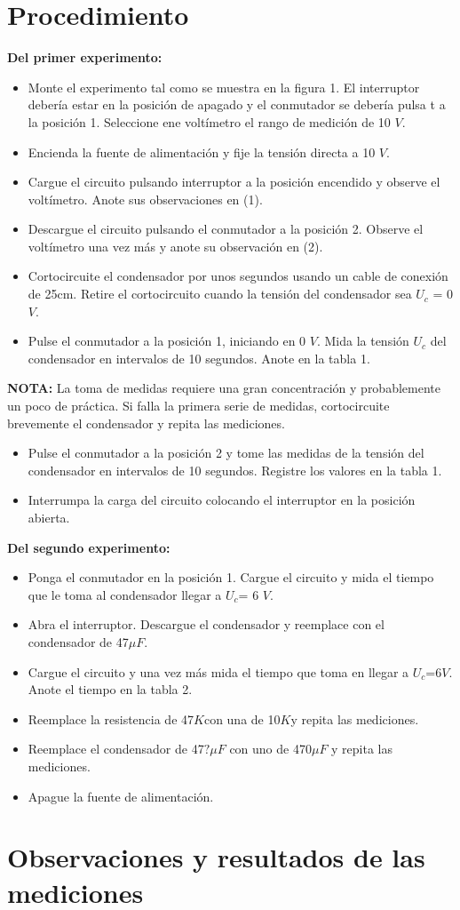 \section{Procedimiento}
\textbf{Del primer experimento:}
\begin{itemize}
	\item Monte el experimento tal como se muestra en la figura  1. El interruptor debería estar en la posición de apagado y el conmutador se debería pulsa t a la posición 1. Seleccione ene voltímetro el rango de medición de 10 $V$.
	\item Encienda la fuente de alimentación y fije la tensión directa a 10 $V$.
	\item Cargue el circuito pulsando interruptor a la posición encendido y observe el voltímetro. Anote sus observaciones en (1).
	\item Descargue el circuito pulsando el conmutador a la posición 2. Observe el voltímetro  una vez más y anote su observación en (2).
	\item Cortocircuite el condensador por unos segundos usando un cable de conexión de 25cm. Retire el cortocircuito cuando la  tensión del condensador sea $U_{c}$ = 0 $V$.
	\item Pulse el conmutador a la posición 1, iniciando en 0 $V$. Mida la tensión $U_{c}$ del condensador en intervalos de 10 segundos. Anote en la tabla 1.
\end{itemize}
\textbf{NOTA:} La toma de medidas requiere  una gran concentración y probablemente un poco de práctica. Si falla la primera serie de medidas, cortocircuite brevemente el condensador y repita las mediciones.
\begin{itemize}
	\item Pulse el conmutador a la posición 2 y tome las medidas de la tensión del condensador en intervalos de 10 segundos. Registre los valores en la tabla 1.
	\item Interrumpa la carga del circuito colocando el interruptor en la posición abierta.
\end{itemize}
\textbf{Del segundo experimento:}
\begin{itemize}
	\item Ponga el conmutador en la posición 1. Cargue el circuito y mida el tiempo que le toma al condensador llegar a $U_{c}$= 6 $V$.
	\item Abra el interruptor. Descargue el condensador y reemplace con el condensador de 47$\mu$$F$.
	\item Cargue el circuito y una vez más mida el tiempo que toma en llegar a $U_{c}$=6$V$. Anote el tiempo en la tabla 2.
	\item Reemplace la resistencia de 47$K$\textohm con una de 10$K$\textohm y repita las mediciones.
	\item Reemplace el condensador de 47$?\mu$$F$ con uno de 470$\mu F$ y repita las mediciones.
	\item Apague la fuente de alimentación.
\end{itemize}
\section{Observaciones y resultados de las mediciones}

